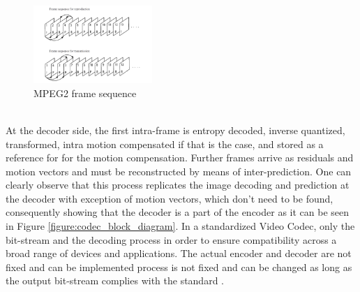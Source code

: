 \documentclass[a4paper,11pt,oneside]{article}
\begin{document}
\begin{figure}[h]
  \centering
  \includegraphics[width=0.4\textwidth]{../figures/frame_sequence_mpeg2.pdf}
  \caption{MPEG2 frame sequence \cite[pp.98]{dsp_henkel}}
  \label{figure:mpeg2_frame_sequence}
\end{figure} \\
\indent At the decoder side, the first intra-frame is entropy decoded, inverse quantized, transformed, intra motion compensated if that is the case, and stored as a reference for for the motion compensation. Further frames arrive as residuals and motion vectors and must be reconstructed by means of inter-prediction. One can clearly observe that this process replicates the image decoding and prediction at the decoder with exception of motion vectors, which don't need to be found, consequently showing that the decoder is a part of the encoder as it can be seen in Figure \ref{figure:codec_block_diagram}.
\indent In a standardized Video Codec, only the bit-stream and the decoding process in order to ensure compatibility across a broad range of devices and applications. The actual encoder and decoder are not fixed and can be implemented process is not fixed and can be changed as long as the output bit-stream complies with the standard \cite{vsp_coursera}.
\end{document}
